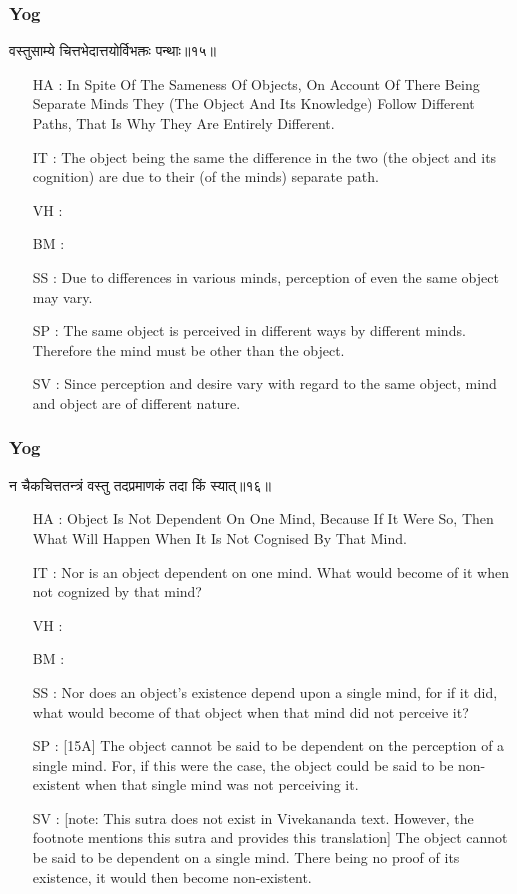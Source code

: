 \begin{frame}[fragile]\frametitle{Yog}
\begin{sanskrit}
वस्तुसाम्ये चित्तभेदात्तयोर्विभक्तः पन्थाः॥१५॥
\end{sanskrit}

	\begin{itemize}
	\item [HA]: In Spite Of The Sameness Of Objects, On Account Of There Being Separate Minds They (The Object And Its Knowledge) Follow Different Paths, That Is Why They Are Entirely Different.
	\item [IT]: The object being the same the difference in the two (the object and its cognition) are due to their (of the minds) separate path.
	\item [VH]: 
	\item [BM]: 
	\item [SS]: Due to differences in various minds, perception of even the same object may vary.
	\item [SP]: The same object is perceived in different ways by different minds. Therefore the mind must be other than the object.
	\item [SV]: Since perception and desire vary with regard to the same object, mind and object are of different nature. 
	\end{itemize}
\end{frame}


\begin{frame}[fragile]\frametitle{Yog}
\begin{sanskrit}
न चैकचित्ततन्त्रं वस्तु तदप्रमाणकं तदा किं स्यात्॥१६॥
\end{sanskrit}

	\begin{itemize}
	\item [HA]: Object Is Not Dependent On One Mind, Because If It Were So, Then What Will Happen When It Is Not Cognised By That Mind.
	\item [IT]: Nor is an object dependent on one mind. What would become of it when not cognized by that mind?
	\item [VH]: 
	\item [BM]: 
	\item [SS]: Nor does an object’s existence depend upon a single mind, for if it did, what would become of that object when that mind did not perceive it?
	\item [SP]: [15A] The object cannot be said to be dependent on the perception of a single mind. For, if this were the case, the object could be said to be non-existent when that single mind was not perceiving it.
	\item [SV]: [note: This sutra does not exist in Vivekananda text. However, the footnote mentions this sutra and provides this translation] The object cannot be said to be dependent on a single mind. There being no proof of its existence, it would then become non-existent. 
	\end{itemize}
\end{frame}


